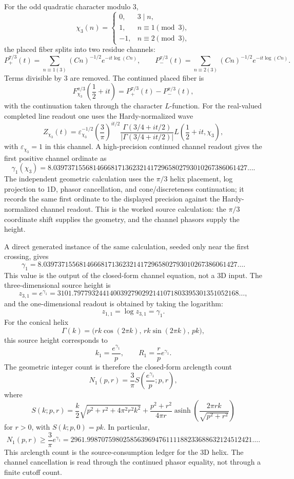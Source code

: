 \documentclass[11pt]{article}
\begin{document}
For the odd quadratic character modulo $3$,
\[
  \chi_3(n)=
  \begin{cases}
    0, & 3\mid n,\\
    1, & n\equiv1\pmod 3,\\
    -1,& n\equiv2\pmod 3,
  \end{cases}
\]
the placed fiber splits into two residue channels:
\[
  P_+^{\pi/3}(t)
    =\sum_{n\equiv1(3)}(Cn)^{-1/2}e^{-it\log(Cn)},
  \qquad
  P_-^{\pi/3}(t)
    =\sum_{n\equiv2(3)}(Cn)^{-1/2}e^{-it\log(Cn)}.
\]
Terms divisible by $3$ are removed.  The continued placed fiber is
\[
  F_{\chi_3}^{\pi/3}\left(\frac12+it\right)
  =
  P_+^{\pi/3}(t)-P_-^{\pi/3}(t),
\]
with the continuation taken through the character $L$-function.
For the real-valued completed line readout one uses the Hardy-normalized wave
\[
  Z_{\chi_3}(t)=\varepsilon_{\chi_3}^{-1/2}
  \left(\frac3\pi\right)^{it/2}
  \frac{\Gamma(3/4+it/2)}{|\Gamma(3/4+it/2)|}
  L\left(\frac12+it,\chi_3\right),
\]
with $\varepsilon_{\chi_3}=1$ in this channel.  A high-precision continued
channel readout gives the first positive channel ordinate as
\[
  \gamma_1(\chi_3)=
  8.039737155681466681713623214172965802793010267386061427\ldots .
\]
The independent geometric calculation uses the $\pi/3$ helix placement, log
projection to 1D, phasor cancellation, and cone/discreteness continuation; it
records the same first ordinate to the displayed precision against the
Hardy-normalized channel readout.  This is the worked source calculation: the
$\pi/3$ coordinate shift supplies the geometry, and the channel phasors supply
the height.

A direct generated instance of the same calculation, seeded only near the first
crossing, gives
\[
  \gamma_1=
  8.039737155681466681713623214172965802793010267386061427\ldots .
\]
This value is the output of the closed-form channel equation, not a 3D input.
The three-dimensional source height is
\[
  z_{3,1}=e^{\gamma_1}
  =
  3101.7977932441400392790292141071803395301351052168\ldots,
\]
and the one-dimensional readout is obtained by taking the logarithm:
\[
  z_{1,1}=\log z_{3,1}=\gamma_1 .
\]
For the conical helix
\[
  \Gamma(k)=\bigl(rk\cos(2\pi k),\,rk\sin(2\pi k),\,pk\bigr),
\]
this source height corresponds to
\[
  k_1=\frac{e^{\gamma_1}}{p},
  \qquad
  R_1=\frac rp e^{\gamma_1}.
\]
The geometric integer count is therefore the closed-form arclength count
\[
  N_1(p,r)=\frac{3}{\pi}
  S\left(\frac{e^{\gamma_1}}{p};p,r\right),
\]
where
\[
  S(k;p,r)=
  \frac{k}{2}\sqrt{p^2+r^2+4\pi^2r^2k^2}
  +
  \frac{p^2+r^2}{4\pi r}
  \operatorname{asinh}\left(\frac{2\pi rk}{\sqrt{p^2+r^2}}\right)
\]
for $r>0$, with $S(k;p,0)=pk$.  In particular,
\[
  N_1(p,r)\ge \frac{3}{\pi}e^{\gamma_1}
  =
  2961.9987075980258563969476111188233688632124512421\ldots .
\]
This arclength count is the source-consumption ledger for the 3D helix.  The
channel cancellation is read through the continued phasor equality, not through
a finite cutoff count.
\end{document}

